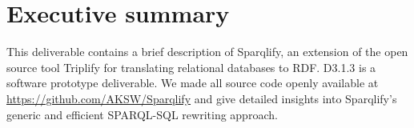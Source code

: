 
\section*{Executive summary}

This deliverable contains a brief description of Sparqlify, an extension of the open source tool Triplify for translating relational databases to RDF.
D3.1.3 is a software prototype deliverable. 
We made all source code openly available at \url{https://github.com/AKSW/Sparqlify} and give detailed insights into
Sparqlify's generic and efficient SPARQL-SQL rewriting approach.


